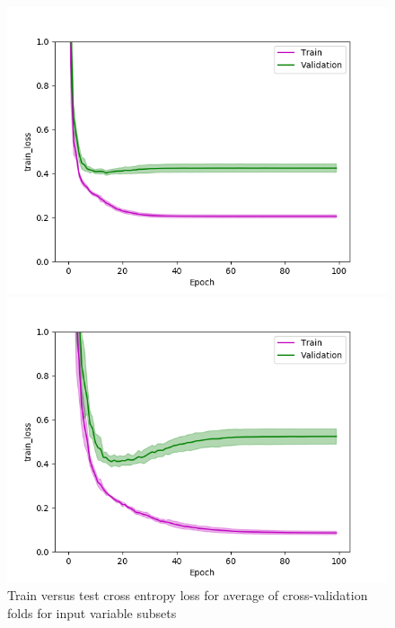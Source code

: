 \def\year{2017}\relax \documentclass[letterpaper]{article}
\begin{document}
\begin{figure}
\begin{minipage}{.24\textwidth}
  \centering
\includegraphics[width=\textwidth]{pics/d3_train_loss_mean_train_test.png}
\caption{$D_3$}\label{fig:d3losstraintest}
\end{minipage}
\begin{minipage}{.01\textwidth}
\end{minipage}
\begin{minipage}{.24\textwidth}
  \centering
\includegraphics[width=\textwidth]{pics/d4_train_loss_mean_train_test.png}
\caption{$D_4$}\label{fig:d4losstraintest}
\end{minipage}
\caption{Train versus test cross entropy loss for average of cross-validation folds for input variable subsets}\label{fig:traintesloss}
\end{figure}
\end{document}
